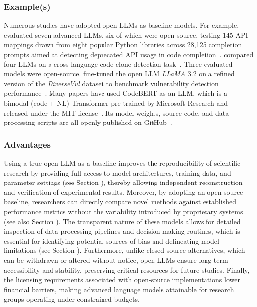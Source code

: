 \subsubsection{Example(s)}

Numerous studies have adopted open LLMs as baseline models.
For example, \citeauthor{wang2024and} evaluated seven advanced LLMs, six of which were open-source, testing 145 API mappings drawn from eight popular Python libraries across 28,125 completion prompts aimed at detecting deprecated API usage in code completion~\cite{wang2024and}.
\citeauthor{moumoula2024large} compared four LLMs on a cross-language code clone detection task~\cite{moumoula2024large}.
Three evaluated models were open-source.
\citeauthor{gonccalves2025evaluating} fine-tuned the open LLM \emph{LLaMA} 3.2 on a refined version of the \emph{DiverseVul} dataset to benchmark vulnerability detection performance~\cite{gonccalves2025evaluating}.
Many papers have used CodeBERT as an LLM, which is a bimodal (code + NL) Transformer pre-trained by Microsoft Research and released under the MIT license~\cite{DBLP:journals/jss/YangZCZHC23, DBLP:conf/gaiis/XiaSD24, DBLP:conf/kbse/SonnekalbGBM22, DBLP:conf/icse/CaiYMMN24}.
Its model weights, source code, and data-processing scripts are all openly published on GitHub~\cite{codebert}.

\subsubsection{Advantages}

Using a true open LLM as a baseline improves the reproducibility of scientific research by providing full access to model architectures, training data, and parameter settings (see Section \modelversion), thereby allowing independent reconstruction and verification of experimental results.
Moreover, by adopting an open-source baseline, researchers can directly compare novel methods against established performance metrics without the variability introduced by proprietary systems (see also Section \benchmarksmetrics).
The transparent nature of these models allows for detailed inspection of data processing pipelines and decision-making routines, which is essential for identifying potential sources of bias and delineating model limitations (see Section \limitationsmitigations).
Furthermore, unlike closed-source alternatives, which can be withdrawn or altered without notice, open LLMs ensure long-term accessibility and stability, preserving critical resources for future studies.
Finally, the licensing requirements associated with open-source implementations lower financial barriers, making advanced language models attainable for research groups operating under constrained budgets.

